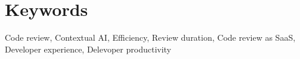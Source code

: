 \section{Keywords}
Code review, Contextual AI, Efficiency, Review duration, Code review as SaaS, Developer experience, Delevoper productivity
